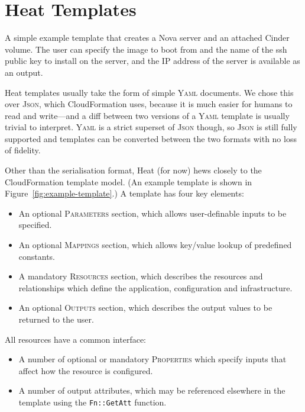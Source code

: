 \section{Heat Templates}

\begin{marginfigure}

\caption{A simple example template that creates a Nova server and an attached Cinder volume. The user can specify the image to boot from and the name of the ssh public key to install on the server, and the IP address of the server is available as an output.}
\label{fig:example-template}
\end{marginfigure}

Heat templates usually take the form of simple \textsc{Yaml} documents. We chose this over \textsc{Json}, which CloudFormation uses, because it is much easier for humans to read and write---and a diff between two versions of a \textsc{Yaml} template is usually trivial to interpret. \textsc{Yaml} is a strict superset of \textsc{Json} though, so \textsc{Json} is still fully supported and templates can be converted between the two formats with no loss of fidelity.

Other than the serialisation format, Heat (for now) hews closely to the CloudFormation template model. (An example template is shown in Figure~\ref{fig:example-template}.) A template has four key elements:

\begin{itemize}
\item An optional \textsc{Parameters} section, which allows user-definable inputs to be specified.
\item An optional \textsc{Mappings} section, which allows key/value lookup of predefined constants.
\item A mandatory \textsc{Resources} section, which describes the resources and relationships which define the application, configuration and infrastructure.
\item An optional \textsc{Outputs} section, which describes the output values to be returned to the user.
\end{itemize}

All resources have a common interface:

\begin{itemize}
\item A number of optional or mandatory \textsc{Properties} which specify inputs that affect how the resource is configured.
\item A number of output attributes, which may be referenced elsewhere in the template using the \texttt{Fn::GetAtt} function.
\end{itemize}

